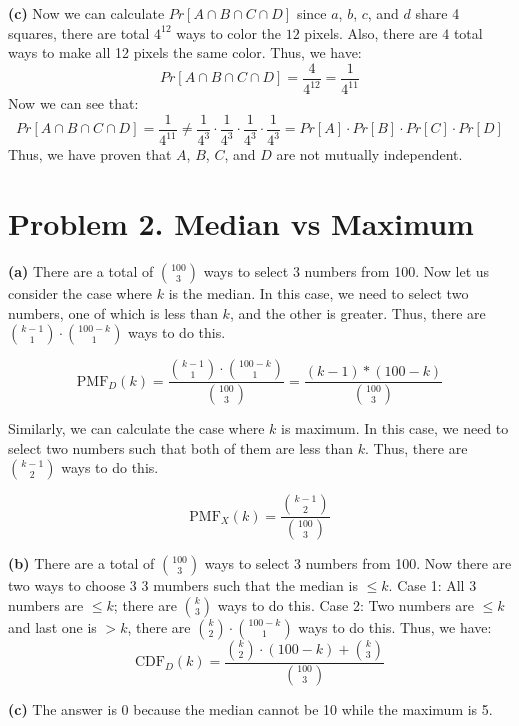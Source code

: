 \documentclass{article}
\begin{document}
\vspace{\baselineskip}
\noindent\textbf{(c)} Now we can calculate $Pr[A \cap B \cap C \cap D]$ since $a$, $b$, $c$, and $d$ share 4 squares, there are total $4^{12}$ ways to color the $12$ pixels.
Also, there are $4$ total ways to make all 12 pixels the same color. Thus, we have:
\[Pr[A \cap B \cap C \cap D] = \frac{4}{4^{12}} = \frac{1}{4^{11}}\]
Now we can see that:
\[Pr[A \cap B \cap C \cap D] = \frac{1}{4^{11}} \neq \frac{1}{4^3} \cdot \frac{1}{4^3} \cdot \frac{1}{4^3} \cdot \frac{1}{4^3} = Pr[A] \cdot Pr[B] \cdot Pr[C] \cdot Pr[D] \]
Thus, we have proven that $A$, $B$, $C$, and $D$ are not mutually independent.



\section*{Problem 2. Median vs Maximum}

\textbf{(a)}
There are a total of $\binom{100}{3}$ ways to select 3 numbers from 100.
Now let us consider the case where $k$ is the median. In this case, we need to select two numbers, one of
which is less than $k$, and the other is greater. Thus, there are $\binom{k-1}{1} \cdot \binom{100-k}{1}$ ways to do this.

\[\text{PMF}_D (k) = \frac{\binom{k-1}{1} \cdot \binom{100-k}{1}}{\binom{100}{3}} = \frac{(k-1)*(100-k)}{\binom{100}{3}}\]

Similarly, we can calculate the case where $k$ is maximum. In this case, we need to select two numbers such that both of them are less than $k$.
Thus, there are $\binom{k-1}{2}$ ways to do this.

\[\text{PMF}_X (k) = \frac{\binom{k-1}{2}}{\binom{100}{3}}\]

\vspace{\baselineskip}
\noindent\textbf{(b)}
There are a total of $\binom{100}{3}$ ways to select 3 numbers from 100.
Now there are two ways to choose 3 3 mumbers such that the median is $\leq k$. Case 1: All 3 numbers are $\leq k$; there are $\binom{k}{3}$ ways to do this.
Case 2: Two numbers are $\leq k$ and last one is $> k$, there are $\binom{k}{2} \cdot \binom{100-k}{1}$ ways to do this.
Thus, we have:
\[\text{CDF}_D (k) = \frac{\binom{k}{2} \cdot (100-k) + \binom{k}{3}}{\binom{100}{3}}\]


\vspace{\baselineskip}
\noindent\textbf{(c)}
The answer is 0 because the median cannot be 10 while the maximum is 5.
\end{document}
